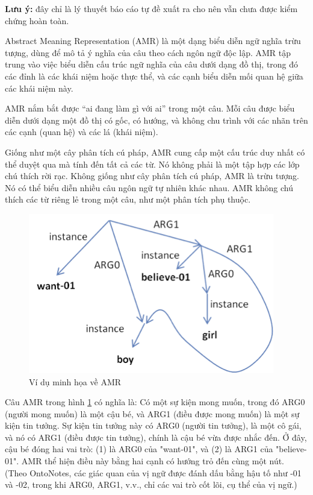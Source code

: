 \textbf{Lưu ý:} đây chỉ là lý thuyết báo cáo tự đề xuất ra cho nên vẫn chưa được kiểm chứng hoàn toàn.

Abstract Meaning Representation (AMR) là một dạng biểu diễn ngữ nghĩa trừu tượng, dùng để mô tả ý nghĩa của câu theo cách ngôn ngữ độc lập\cite{amr-guidelines}. AMR tập trung vào việc biểu diễn cấu trúc ngữ nghĩa của câu dưới dạng đồ thị, trong đó các đỉnh là các khái niệm hoặc thực thể, và các cạnh biểu diễn mối quan hệ giữa các khái niệm này.

AMR nắm bắt được “ai đang làm gì với ai” trong một câu. Mỗi câu được biểu diễn dưới dạng một đồ thị có gốc, có hướng, và không chu trình với các nhãn trên các cạnh (quan hệ) và các lá (khái niệm)\cite{amr-guidelines}.

Giống như một cây phân tích cú pháp, AMR cung cấp một cấu trúc duy nhất có thể duyệt qua mà tính đến tất cả các từ. Nó không phải là một tập hợp các lớp chú thích rời rạc. Không giống như cây phân tích cú pháp, AMR là trừu tượng. Nó có thể biểu diễn nhiều câu ngôn ngữ tự nhiên khác nhau. AMR không chú thích các từ riêng lẻ trong một câu, như một phân tích phụ thuộc\cite{amr-guidelines}.

\begin{figure}[H]
    \centering
    \includegraphics[width=0.7\linewidth]{Images/GDL/amr_ex.png}
    \caption{Ví dụ minh họa về AMR\cite{amr-guidelines}}
    \label{fig:ex_amr}
\end{figure}

Câu AMR trong hình \ref{fig:ex_amr} có nghĩa là: Có một sự kiện mong muốn, trong đó ARG0 (người mong muốn) là một cậu bé, và ARG1 (điều được mong muốn) là một sự kiện tin tưởng. Sự kiện tin tưởng này có ARG0 (người tin tưởng), là một cô gái, và nó có ARG1 (điều được tin tưởng), chính là cậu bé vừa được nhắc đến. Ở đây, cậu bé đóng hai vai trò: (1) là ARG0 của "want-01", và (2) là ARG1 của "believe-01". AMR thể hiện điều này bằng hai cạnh có hướng trỏ đến cùng một nút. (Theo OntoNotes, các giác quan của vị ngữ được đánh dấu bằng hậu tố như -01 và -02, trong khi ARG0, ARG1, v.v., chỉ các vai trò cốt lõi, cụ thể của vị ngữ.)

